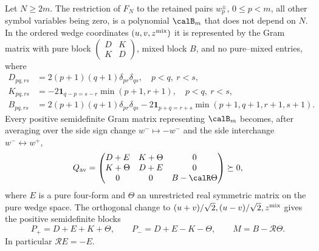 \begin{lemma}\label{lem:corner}
Let $N\ge2m$. The restriction of $F_N$ to the retained pairs
$w_p^\pm$, $0\le p<m$, all other symbol variables being zero, is a
polynomial $\calB_m$ that does not depend on $N$. In the ordered wedge
coordinates $(u,v,z^{\rm mix})$ it is represented by the Gram matrix with pure
block \(\left(\begin{smallmatrix}D&K\\K&D\end{smallmatrix}\right)\),
mixed block \(B\), and no pure--mixed entries, where
\begin{equation}
\begin{aligned}
 D_{pq,rs}&=2(p+1)(q+1)\delta_{pr}\delta_{qs},\quad p<q,\ r<s,\\
 K_{pq,rs}&=-2\mathbf1_{q-p=s-r}\min(p+1,r+1),\quad p<q,\ r<s,\\
 B_{pq,rs}&=2(p+1)(q+1)\delta_{pr}\delta_{qs}
 -2\mathbf1_{p+q=r+s}\min(p+1,q+1,r+1,s+1).
\end{aligned}                                                    \label{eq:corner-baselines}
\end{equation}
Every positive semidefinite Gram matrix representing $\calB_m$ becomes,
after averaging over the side sign change $w^-\mapsto-w^-$ and the side
interchange $w^-\leftrightarrow w^+$,
\begin{equation}\label{eq:corner-gram}
 Q_{\rm av}=\begin{pmatrix}
 D+E&K+\Theta&0\\
 K+\Theta&D+E&0\\
 0&0&B-\calR\Theta
 \end{pmatrix}\succeq0,
\end{equation}
where \(E\) is a pure four-form and \(\Theta\) an unrestricted real
symmetric matrix on the pure wedge space. The orthogonal change to
$(u+v)/\sqrt2,(u-v)/\sqrt2,z^{\rm mix}$ gives the positive semidefinite blocks
\begin{equation}
 P_+=D+E+K+\Theta,\qquad P_-=D+E-K-\Theta,\qquad M=B-\mathcal R\Theta.             \label{eq:corner-sectors}
\end{equation}
In particular \(\mathcal RE=-E\).
\end{lemma}

